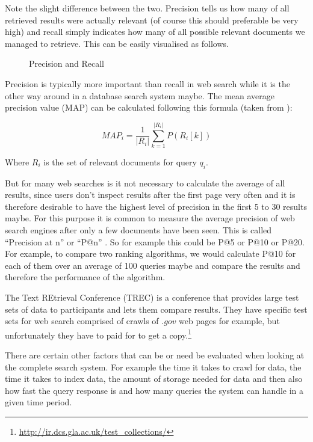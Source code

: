 Note the slight difference between the two. Precision tells us how many of all retrieved results were actually relevant (of course this should preferable be very high) and recall simply indicates how many of all possible relevant documents we managed to retrieve. This can be easily visualised as follows.

\begin{figure}[htbp]
  \centering
  
  \caption[Precision and Recall]{Precision and Recall}
\label{fig:PR}
\end{figure}

Precision is typically more important than recall in web search while it is the other way around in a database search system maybe. The mean average precision value (MAP) can be calculated following this formula (taken from \cite[p.141]{Baeza-Yates2011}):

\begin{equation}
  MAP_i = \frac{1}{|R_i|} \sum_{k=1}^{|R_i|} P(R_i[k])
  \label{eq:MAP}
\end{equation}

Where $R_i$ is the set of relevant documents for query $q_i$.

But for many web searches is it not necessary to calculate the average of all results, since users don't inspect results after the first page very often and it is therefore desirable to have the highest level of precision in the first 5 to 30 results maybe. For this purpose it is common to measure the average precision of web search engines after only a few documents have been seen. This is called ``Precision at n'' or ``P@n'' \parencite[p.140]{Baeza-Yates2011}. So for example this could be P@5 or P@10 or P@20. For example, to compare two ranking algorithms, we would calculate P@10 for each of them over an average of 100 queries maybe and compare the results and therefore the performance of the algorithm.

The Text REtrieval Conference (TREC) is a conference that provides large test sets of data to participants and lets them compare results. They have specific test sets for web search comprised of crawls of $.gov$ web pages for example, but unfortunately they have to paid for to get a copy.\footnote{\url{http://ir.dcs.gla.ac.uk/test_collections/}}%

There are certain other factors that can be or need be evaluated when looking at the complete search system. For example the time it takes to crawl for data, the time it takes to index data, the amount of storage needed for data and then also how fast the query response is and how many queries the system can handle in a given time period.


